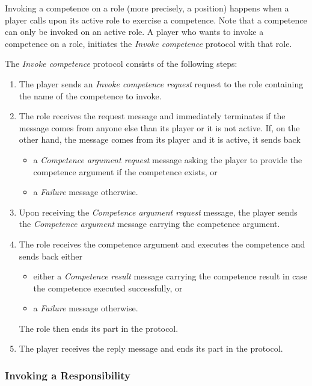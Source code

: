 Invoking a competence on a role (more precisely, a position) happens when a player calls upon its active role to exercise a competence.
Note that a competence can only be invoked on an active role.
A player who wants to invoke a competence on a role, initiates the \textit{Invoke competence} protocol with that role.

The \textit{Invoke competence} protocol consists of the following steps:
\begin{enumerate}
	\item The player sends an \textit{Invoke competence request} request to the role containing the name of the competence to invoke.
	\item The role receives the request message and immediately terminates if the message comes from anyone else than its player or it is not active.
	If, on the other hand, the message comes from its player and it is active, it sends back 
	\begin{itemize}
		\item a \textit{Competence argument request} message asking the player to provide the competence argument if the competence exists, or
		\item a \textit{Failure} message otherwise. 
	\end{itemize}
	\item Upon receiving the \textit{Competence argument request} message, the player sends the \textit{Competence argument} message carrying the competence argument.
	\item The role receives the competence argument and executes the competence and sends back either
	\begin{itemize}
		\item either a \textit{Competence result} message carrying the competence result in case the competence executed successfully, or
		\item a \textit{Failure} message otherwise.
	\end{itemize}
	The role then ends its part in the protocol.
	\item The player receives the reply message and ends its part in the protocol.
\end{enumerate}

\subsubsection{Invoking a Responsibility}

